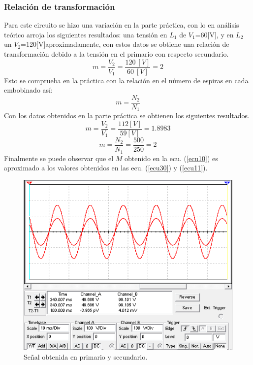 \documentclass[twocolumn]{IEEEtran}
\begin{document}
\subsubsection{Relación de transformación}
\noindent
Para este circuito se hizo una variación en la parte práctica, con lo en análisis teórico arroja los siguientes resultados: una tensión en  $L_1$ de $V_1$=60[V], y en $L_2$ un $V_2$=120[V]aproximadamente, con estos datos se obtiene una relación de transformación debido a la tensión en el primario con respecto secundario.
\begin{equation}
 m =  \frac{V_2}{V_1}=\frac{120\ [V]}{60\ [V]}=2
\label{ecu30}
\end{equation}
\noindent
Esto se comprueba  en la práctica con la relación en el número de espiras en cada embobinado así:
\begin{equation}
 m =  \frac{N_2}{N_1}
\label{ecu31}
\end{equation}
\noindent
Con los datos obtenidos en la parte práctica se obtienen los siguientes resultados.
\begin{equation}
 m =  \frac{V_2}{V_1}=\frac{112[V]}{59[V]}=1.8983
\label{ecu10}
\end{equation}
\begin{equation}
 m =  \frac{N_2}{N_1}=\frac{500}{250}=2
\label{ecu11}
\end{equation}
\noindent
Finalmente se puede observar que el $M$ obtenido en la ecu. (\ref{ecu10}) es aproximado a los valores obtenidos en las ecu. (\ref{ecu30}) y (\ref{ecu11}).
\begin{figure}[H]
	\centering
		\includegraphics[scale=0.5]{sim2.PNG}
	\caption{Señal obtenida en primario y secundario.}
	\label{fig14}
\end{figure}
\end{document}
